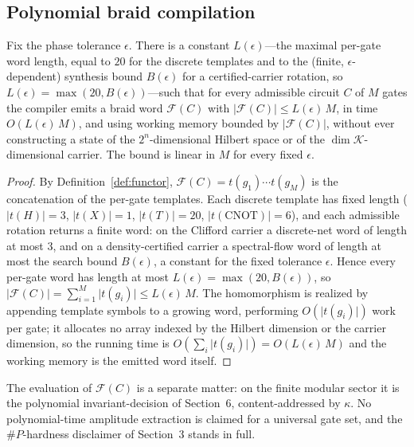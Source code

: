 \subsection{Polynomial braid compilation}
\label{sec:compiler_thm}
\begin{theorem}
\label{thm:compile}
Fix the phase tolerance $\epsilon$. There is a constant $L(\epsilon)$---the maximal per-gate word length, equal to $20$ for the discrete templates and to the (finite, $\epsilon$-dependent) synthesis bound $B(\epsilon)$ for a certified-carrier rotation, so $L(\epsilon)=\max(20, B(\epsilon))$---such that for every admissible circuit $C$ of $M$ gates the compiler emits a braid word $\mathcal{F}(C)$ with $\lvert\mathcal{F}(C)\rvert \le L(\epsilon)\,M$, in time $O(L(\epsilon)\,M)$, and using working memory bounded by $\lvert\mathcal{F}(C)\rvert$, without ever constructing a state of the $2^n$-dimensional Hilbert space or of the $\dim\mathcal{K}$-dimensional carrier. The bound is linear in $M$ for every fixed $\epsilon$.
\end{theorem}
\begin{proof}
By Definition~\ref{def:functor}, $\mathcal{F}(C)=t(g_1)\cdots t(g_M)$ is the concatenation of the per-gate templates. Each discrete template has fixed length ($\lvert t(H)\rvert=3$, $\lvert t(X)\rvert=1$, $\lvert t(T)\rvert=20$, $\lvert t(\mathrm{CNOT})\rvert=6$), and each admissible rotation returns a finite word: on the Clifford carrier a discrete-net word of length at most $3$, and on a density-certified carrier a spectral-flow word of length at most the search bound $B(\epsilon)$, a constant for the fixed tolerance $\epsilon$. Hence every per-gate word has length at most $L(\epsilon)=\max(20, B(\epsilon))$, so $\lvert\mathcal{F}(C)\rvert=\sum_{i=1}^{M}\lvert t(g_i)\rvert\le L(\epsilon)\,M$. The homomorphism is realized by appending template symbols to a growing word, performing $O(\lvert t(g_i)\rvert)$ work per gate; it allocates no array indexed by the Hilbert dimension or the carrier dimension, so the running time is $O(\sum_i\lvert t(g_i)\rvert)=O(L(\epsilon)\,M)$ and the working memory is the emitted word itself.
\end{proof}

The evaluation of $\mathcal{F}(C)$ is a separate matter: on the finite modular sector it is the polynomial invariant-decision of Section~6, content-addressed by $\kappa$. No polynomial-time amplitude extraction is claimed for a universal gate set, and the $\#P$-hardness disclaimer of Section~3 stands in full.

